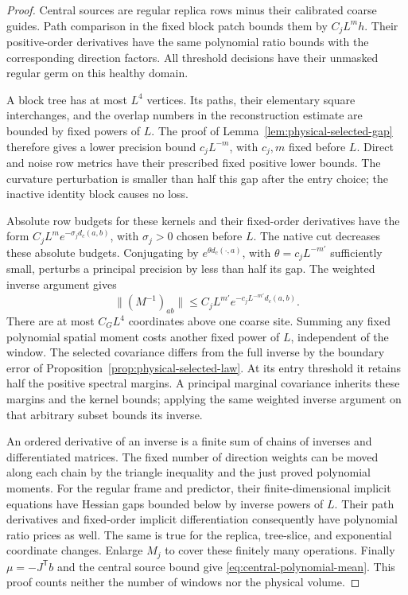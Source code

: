 \documentclass[11pt,reqno]{amsart}
\numberwithin{equation}{section}
\theoremstyle{definition}
\theoremstyle{remark}
\begin{document}
\begin{proof}
Central sources are regular replica rows minus their
calibrated coarse guides. Path comparison in the fixed block
patch bounds them by \(C_jL^m h\). Their positive-order
derivatives have the same polynomial ratio bounds with the
corresponding direction factors. All threshold decisions have
their unmasked regular germ on this healthy domain.

A block tree has at most \(L^4\) vertices. Its paths, their
elementary square interchanges, and the overlap numbers in
the reconstruction estimate are bounded by fixed powers of
\(L\). The proof of Lemma~\ref{lem:physical-selected-gap}
therefore gives a lower precision bound \(c_jL^{-m}\), with
\(c_j,m\) fixed before \(L\). Direct and noise row metrics
have their prescribed fixed positive lower bounds. The
curvature perturbation is smaller than half this gap after
the entry choice; the inactive identity block causes no loss.

Absolute row budgets for these kernels and their fixed-order
derivatives have the form
\(C_jL^m e^{-\sigma_jd_c(a,b)}\), with \(\sigma_j>0\)
chosen before \(L\). The native cut decreases these absolute
budgets. Conjugating by \(e^{\theta d_c(\cdot,a)}\), with
\(\theta=c_jL^{-m'}\) sufficiently small, perturbs a principal
precision by less than half its gap. The weighted inverse
argument gives
\[
       \|(M^{-1})_{ab}\|
               \le C_jL^{m'}e^{-c_jL^{-m'}d_c(a,b)}.
\]
There are at most \(C_GL^4\) coordinates above one coarse
site. Summing any fixed polynomial spatial moment costs
another fixed power of \(L\), independent of the window.
The selected covariance differs from the full inverse by
the boundary error of Proposition~\ref{prop:physical-selected-law}.
At its entry threshold it retains half the positive spectral
margins. A principal marginal covariance inherits these
margins and the kernel bounds; applying the same weighted
inverse argument on that arbitrary subset bounds its inverse.

An ordered derivative of an inverse is a finite sum of chains
of inverses and differentiated matrices. The fixed number
of direction weights can be moved along each chain by the
triangle inequality and the just proved polynomial moments.
For the regular frame and predictor, their finite-dimensional
implicit equations have Hessian gaps bounded below by inverse
powers of \(L\). Their path derivatives and fixed-order
implicit differentiation consequently have polynomial ratio
prices as well. The same is true for the replica, tree-slice,
and exponential coordinate changes. Enlarge \(M_j\) to cover
these finitely many operations. Finally \(\mu=-J^{\mathsf T}b\) and the
central source bound give \eqref{eq:central-polynomial-mean}.
This proof counts neither the number of windows nor the
physical volume.
\end{proof}
\end{document}
